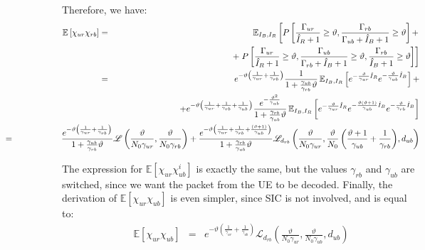 \documentclass[12pt, letterpaper, onecolumn, draftcls]{IEEEtran}
\begin{document}
Therefore, we have:
\begin{eqnarray}
 \mathbb{E}\left[\chi_{ur}\chi_{rb}\right] & = &  \mathbb{E}_{I_B,I_R}\left[P\left[\frac{\Gamma_{ur}}{\hat{I}_R+1}\geq\vartheta,\frac{\Gamma_{rb}}{\Gamma_{ub}+\hat{I}_B+1}\geq\vartheta\right]+\right.\nonumber\\
& & + \left.P\left[\frac{\Gamma_{ur}}{\hat{I}_R+1}\geq\vartheta,\frac{\Gamma_{ub}}{\Gamma_{rb}+\hat{I}_B+1}\geq\vartheta, \frac{\Gamma_{rb}}{\hat{I}_B+1}\geq\vartheta\right]\right] \nonumber\\
 & = & e^{-\vartheta\left(\frac{1}{\gamma_{ur}}+\frac{1}{\gamma_{rb}}\right)}\frac{1}{1+\frac{\gamma_{ub}}{\gamma_{rb}}\vartheta}\,\mathbb{E}_{I_B,I_R}\left[e^{-\frac{\vartheta}{\gamma_{ur}}\hat{I}_R}e^{-\frac{\vartheta}{\gamma_{ub}}\hat{I}_B}\right] + \nonumber\\
 & & + e^{-\vartheta\left(\frac{1}{\gamma_{ur}}+\frac{1}{\gamma_{rb}}+\frac{1}{\gamma_{ub}}\right)}\frac{e^{-\frac{\vartheta^2}{\gamma_{ub}}}}{1+\frac{\gamma_{rb}}{\gamma_{ub}}\vartheta}\,\mathbb{E}_{I_B,I_R}\left[e^{-\frac{\vartheta}{\gamma_{ur}}\hat{I}_R}e^{-\frac{\vartheta(\vartheta+1)}{\gamma_{ub}}\hat{I}_B}e^{-\frac{\vartheta}{\gamma_{rb}}\hat{I}_B}\right] \nonumber \\
 & \hspace{-4cm}= &\hspace{-2.3cm} \frac{e^{-\vartheta\left(\frac{1}{\gamma_{ur}}+\frac{1}{\gamma_{rb}}\right)}}{1+\frac{\gamma_{ub}}{\gamma_{rb}}\vartheta}\mathscr{L}\left(\frac{\vartheta}{N_0\gamma_{ur}},\frac{\vartheta}{N_0\gamma_{rb}}\right) + \frac{e^{-\vartheta\left(\frac{1}{\gamma_{ur}}+\frac{1}{\gamma_{rb}}+\frac{(\vartheta+1)}{\gamma_{ub}}\right)}}{1+\frac{\gamma_{rb}}{\gamma_{ub}}\vartheta}\mathscr{L}_{d_{rb}}\left(\frac{\vartheta}{N_0\gamma_{ur}},\frac{\vartheta}{N_0}\left(\frac{\vartheta+1}{\gamma_{ub}}+\frac{1}{\gamma_{rb}}\right)\!,d_{ub}\right)\nonumber\\
 \label{E_urrb}
\end{eqnarray}

The expression for $\mathbb{E}\left[\chi_{ur}\chi_{ub}^i\right]$ is exactly the same, but the values $\gamma_{rb}$ and $\gamma_{ub}$ are switched, since we want the packet from the UE to be decoded. Finally, the derivation of $\mathbb{E}\left[\chi_{ur}\chi_{ub}\right]$ is even simpler, since SIC is not involved, and is equal to:
\begin{eqnarray}
 \mathbb{E}\left[\chi_{ur}\chi_{ub}\right] & = & e^{-\vartheta\left(\frac{1}{\gamma_{ur}}+\frac{1}{\gamma_{ub}}\right)}\mathscr{L}_{d_{rb}}\left(\frac{\vartheta}{N_0\gamma_{ur}},\frac{\vartheta}{N_0\gamma_{ub}},d_{ub}\right)
\end{eqnarray}
\end{document}
